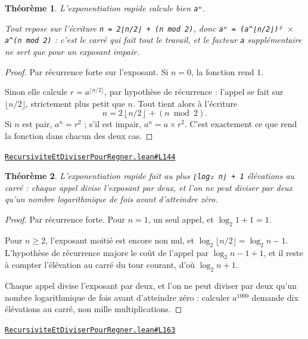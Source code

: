 \documentclass[11pt,a4paper]{article}
\theoremstyle{definition}
\theoremstyle{plain}
\newtheorem{theoreme}{Théorème}
\newcommand{\source}[2]{\par\smallskip\noindent\hfill{\footnotesize\href{#1}{\texttt{#2}}}\par\smallskip}
\begin{document}
\begin{theoreme}
L'exponentiation rapide calcule bien \texttt{aⁿ}.

Tout repose sur l'écriture \texttt{n = 2⌊n/2⌋ + (n mod 2)}, donc
\texttt{aⁿ = (a\textasciicircum{}⌊n/2⌋)² \(\times\) a\textasciicircum{}(n mod 2)} : c'est le carré qui fait tout le travail, et le
facteur \texttt{a} supplémentaire ne sert que pour un exposant impair.
\end{theoreme}
\begin{proof}
Par récurrence forte sur l'exposant. Si \(n = 0\), la fonction rend \(1\).

Sinon elle calcule \(r = a^{\lfloor n/2 \rfloor}\), par hypothèse de récurrence :
l'appel se fait sur \(\lfloor n/2 \rfloor\), strictement plus petit que \(n\). Tout
tient alors à l'écriture
\[ n = 2\left\lfloor n/2 \right\rfloor + (n \bmod 2) . \]
Si \(n\) est pair, \(a^n = r^2\) ; s'il est impair, \(a^n = a \times r^2\). C'est
exactement ce que rend la fonction dans chacun des deux cas.
\end{proof}
\source{https://github.com/Commutator-IO/learn-lean/blob/main/courses/02-lycee/11-informatique-nsi/RecursiviteEtDiviserPourRegner.lean\#L144}{RecursiviteEtDiviserPourRegner.lean\#L144}

\begin{theoreme}
L'exponentiation rapide fait au plus \texttt{⌊log₂ n⌋ + 1} élévations au carré : chaque
appel divise l'exposant par deux, et l'on ne peut diviser par deux qu'un nombre
logarithmique de fois avant d'atteindre zéro.
\end{theoreme}
\begin{proof}
Par récurrence forte. Pour \(n = 1\), un seul appel, et \(\log_2 1 + 1 = 1\).

Pour \(n \ge 2\), l'exposant moitié est encore non nul, et
\(\log_2 \lfloor n/2 \rfloor = \log_2 n - 1\). L'hypothèse de récurrence majore le coût
de l'appel par \(\log_2 n - 1 + 1\), et il reste à compter l'élévation au carré du tour
courant, d'où \(\log_2 n + 1\).

Chaque appel divise l'exposant par deux, et l'on ne peut diviser par deux qu'un nombre
logarithmique de fois avant d'atteindre zéro : calculer \(a^{1000}\) demande dix
élévations au carré, non mille multiplications.
\end{proof}
\source{https://github.com/Commutator-IO/learn-lean/blob/main/courses/02-lycee/11-informatique-nsi/RecursiviteEtDiviserPourRegner.lean\#L163}{RecursiviteEtDiviserPourRegner.lean\#L163}
\end{document}
